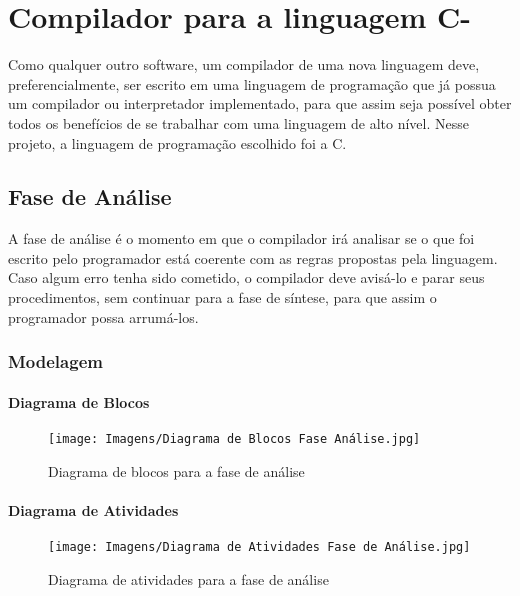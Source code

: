 \documentclass[
	12pt,				%
	oneside,
	a4paper,			%
	english,			%
	french,				%
	spanish,			%
	brazil,				%
	]{abntex2}
\begin{document}
\chapter{Compilador para a linguagem C-}

Como qualquer outro software, um compilador de uma nova linguagem deve, preferencialmente, ser escrito em uma linguagem de programação que já possua um compilador ou interpretador implementado, para que assim seja possível obter todos os benefícios de se trabalhar com uma linguagem de alto nível. Nesse projeto, a linguagem de programação escolhido foi a C.

\section{Fase de Análise}

A fase de análise é o momento em que o compilador irá analisar se o que foi escrito pelo programador está coerente com as regras propostas pela linguagem. Caso algum erro tenha sido cometido, o compilador deve avisá-lo e parar seus procedimentos, sem continuar para a fase de síntese, para que assim o programador possa arrumá-los.

\subsection{Modelagem}

\subsubsection{Diagrama de Blocos}

\begin{figure}[H]
\centering 
\caption{Diagrama de blocos para a fase de análise} \label{fig:DiagramaBlocosAnalise}
\graphicspath{ {./Imagens/} } 
\texttt{[image: Imagens/Diagrama de Blocos Fase Análise.jpg]}
\end{figure}

\subsubsection{Diagrama de Atividades}

\begin{figure}[H]
\centering 
\caption{Diagrama de atividades para a fase de análise} \label{fig:DiagramaAtividadesAnalise}
\graphicspath{ {./Imagens/} } 
\texttt{[image: Imagens/Diagrama de Atividades Fase de Análise.jpg]}
\end{figure}
\end{document}
